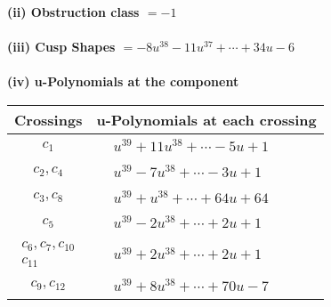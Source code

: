 \documentclass[1p]{elsarticle_modified}
\theoremstyle{definition}
\begin{document}
\flushleft \textbf{(ii) Obstruction class $= -1$}\\~\\
\flushleft \textbf{(iii) Cusp Shapes $= -8 u^{38}-11 u^{37}+\cdots+34 u-6$}\\~\\
\newpage\renewcommand{\arraystretch}{1}
\flushleft \textbf{(iv) u-Polynomials at the component}\newline \\
\begin{tabular}{m{50pt}|m{274pt}}
Crossings & \hspace{64pt}u-Polynomials at each crossing \\
\hline $$\begin{aligned}c_{1}\end{aligned}$$&$\begin{aligned}
&u^{39}+11 u^{38}+\cdots-5 u+1
\end{aligned}$\\
\hline $$\begin{aligned}c_{2},c_{4}\end{aligned}$$&$\begin{aligned}
&u^{39}-7 u^{38}+\cdots-3 u+1
\end{aligned}$\\
\hline $$\begin{aligned}c_{3},c_{8}\end{aligned}$$&$\begin{aligned}
&u^{39}+u^{38}+\cdots+64 u+64
\end{aligned}$\\
\hline $$\begin{aligned}c_{5}\end{aligned}$$&$\begin{aligned}
&u^{39}-2 u^{38}+\cdots+2 u+1
\end{aligned}$\\
\hline $$\begin{aligned}c_{6},c_{7},c_{10}\\c_{11}\end{aligned}$$&$\begin{aligned}
&u^{39}+2 u^{38}+\cdots+2 u+1
\end{aligned}$\\
\hline $$\begin{aligned}c_{9},c_{12}\end{aligned}$$&$\begin{aligned}
&u^{39}+8 u^{38}+\cdots+70 u-7
\end{aligned}$\\
\hline
\end{tabular}\\~\\
\end{document}
